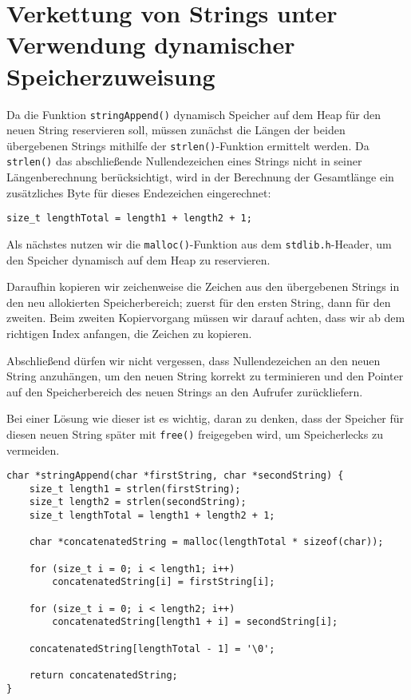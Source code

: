 \chapter{Verkettung von Strings unter Verwendung dynamischer Speicherzuweisung}

Da die Funktion \texttt{stringAppend()} dynamisch Speicher auf dem Heap
für den neuen String reservieren soll, müssen zunächst die Längen der beiden
übergebenen Strings mithilfe der \texttt{strlen()}-Funktion ermittelt
werden. Da \texttt{strlen()} das abschließende Nullendezeichen eines
Strings nicht in seiner Längenberechnung berücksichtigt, wird in der Berechnung
der Gesamtlänge ein zusätzliches Byte für dieses Endezeichen eingerechnet:

\texttt{size_t lengthTotal = length1 + length2 + 1;}

Als nächstes nutzen wir die \texttt{malloc()}-Funktion aus dem
\texttt{stdlib.h}-Header, um den Speicher dynamisch auf dem Heap zu
reservieren.

Daraufhin kopieren wir zeichenweise die Zeichen aus den übergebenen Strings in
den neu allokierten Speicherbereich; zuerst für den ersten String, dann für den
zweiten. Beim zweiten Kopiervorgang müssen wir darauf achten, dass wir ab dem
richtigen Index anfangen, die Zeichen zu kopieren.

Abschließend dürfen wir nicht vergessen, dass Nullendezeichen an den neuen
String anzuhängen, um den neuen String korrekt zu terminieren und den Pointer
auf den Speicherbereich des neuen Strings an den Aufrufer zurückliefern.

Bei einer Lösung wie dieser ist es wichtig, daran zu denken, dass der Speicher
für diesen neuen String später mit \texttt{free()} freigegeben wird, um
Speicherlecks zu vermeiden.

\begin{verbatim}
char *stringAppend(char *firstString, char *secondString) {
    size_t length1 = strlen(firstString);
    size_t length2 = strlen(secondString);
    size_t lengthTotal = length1 + length2 + 1;

    char *concatenatedString = malloc(lengthTotal * sizeof(char));

    for (size_t i = 0; i < length1; i++)
        concatenatedString[i] = firstString[i];

    for (size_t i = 0; i < length2; i++)
        concatenatedString[length1 + i] = secondString[i];

    concatenatedString[lengthTotal - 1] = '\0';

    return concatenatedString;
}
\end{verbatim}





